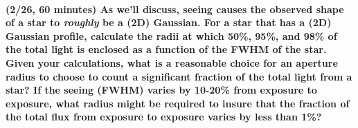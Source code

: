 \documentclass[12pt]{article}
\begin{document}
\paragraph{(2/26, 60 minutes) As we'll discuss, seeing causes the
observed shape of a star to \emph{roughly} be a (2D) Gaussian. For a star
that has a (2D) Gaussian profile, calculate the radii at which 50\%,
95\%, and 98\% of the total light is enclosed as a function of the FWHM
of the star. Given your calculations, what is a reasonable choice for
an aperture radius to choose to count a significant fraction of the
total light from a star? If the seeing (FWHM) varies by 10-20\% from
exposure to exposure, what radius might be required to insure that the
fraction of the total flux from exposure to exposure varies by less
than 1\%?}
\end{document}
